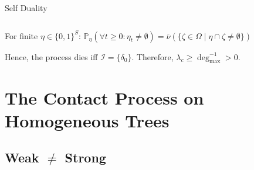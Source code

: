 \documentclass[envcountsect, aspectratio=149]{beamer}
\renewcommand{\P}{\mathbb{P}}
\renewcommand{\[}{
	\setlength\abovedisplayskip{0.5ex}
	\setlength{\belowdisplayskip}{0.5ex}
	\setlength{\abovedisplayshortskip}{0.5ex}
	\setlength{\belowdisplayshortskip}{0.5ex}\begin{equation*}}
\begin{document}
\begin{frame}{Self Duality}
\begin{columns}
\begin{column}{0.42\textwidth}
	\end{column}
	\end{columns}
	\end{frame}
	
	\begin{frame}
		\begin{corollary}
			For finite $\eta\in\{0,1\}^S$: $\P_\eta(\forall t\geq0: \eta_t \neq \emptyset) = \overline{\nu}(\{ \zeta\in \Omega \mid \eta \cap \zeta \neq \emptyset \})$
			\pause\medskip
			
			Hence, the process dies iff $\mathcal{I} = \{ \delta_0 \}$. Therefore, $\lambda_c\geq \deg_{\max}^{-1} > 0$.
		\end{corollary}
	\end{frame}
	
	
	\section{The Contact Process on Homogeneous Trees}
	\subsection{Weak $\neq$ Strong}
	
\end{document}
